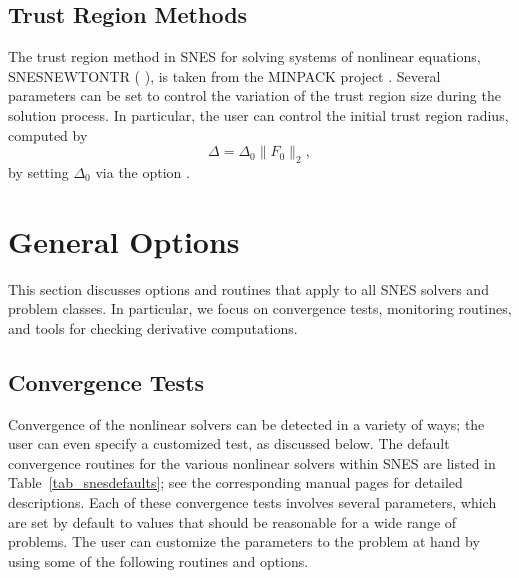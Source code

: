 \subsection{Trust Region Methods}

The trust region method in SNES for solving systems of nonlinear
equations, SNESNEWTONTR ( ), is taken from
the MINPACK project \cite{more84}. Several parameters can be set to
control the variation of the trust region size during the solution
process.  In particular, the user can control the initial trust region
radius, computed by
\[
  \Delta = \Delta_0 \| F_0 \|_2,
\]
by setting $ \Delta_0 $ via the option
.

\section{General Options}

This section discusses options and routines that apply to all SNES
solvers and problem classes.  In particular, we focus on convergence
tests, monitoring routines, and tools for checking derivative
computations.

\subsection{Convergence Tests}
\label{sec_snesconvergence}

Convergence of the nonlinear solvers can be detected in a variety of
ways; the user can even specify a customized test, as discussed
below.  The default convergence routines for
the various nonlinear solvers within SNES are listed in
Table~\ref{tab_snesdefaults}; see the corresponding manual pages for
detailed descriptions.  Each of these convergence tests involves
several parameters, which are set by default to values that should be
reasonable for a wide range of problems.  The user can customize the
parameters to the problem at hand by using some of the following
routines and options.

